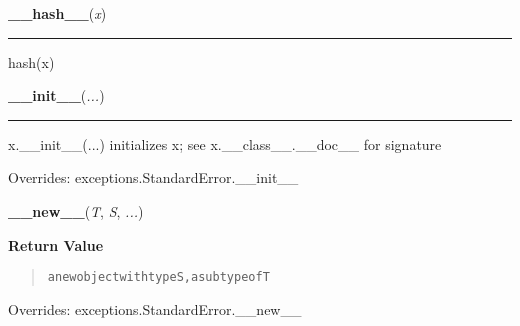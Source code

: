     \label{object:__hash__}

    \vspace{0.5ex}

    \begin{boxedminipage}{\textwidth}

    \raggedright \textbf{\_\_hash\_\_}(\textit{x})

    \vspace{-1.5ex}

    \rule{\textwidth}{0.5\fboxrule}
    hash(x)

    \vspace{1ex}

    \end{boxedminipage}

    \vspace{0.5ex}

    \begin{boxedminipage}{\textwidth}

    \raggedright \textbf{\_\_init\_\_}(\textit{...})

    \vspace{-1.5ex}

    \rule{\textwidth}{0.5\fboxrule}
    x.\_\_init\_\_(...) initializes x; see x.\_\_class\_\_.\_\_doc\_\_ for 
    signature

    \vspace{1ex}

      Overrides: exceptions.StandardError.\_\_init\_\_

    \end{boxedminipage}

    \vspace{0.5ex}

    \begin{boxedminipage}{\textwidth}

    \raggedright \textbf{\_\_new\_\_}(\textit{T}, \textit{S}, \textit{...})

      \textbf{Return Value}
      \begin{quote}
\begin{alltt}
a new object with type S, a subtype of T
\end{alltt}

      \end{quote}

    \vspace{1ex}

      Overrides: exceptions.StandardError.\_\_new\_\_

    \end{boxedminipage}

